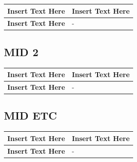 \documentclass [10pt]{article}
\begin{document}
\begin{longtable}{| p{ } | p{ } | }\hline 
\textbf{Insert Text Here} & \textbf{Insert Text Here} \\ \hline
\textbf{Insert Text Here} & -\\ \hline 
\end{longtable}


\subsection {MID 2 }

\begin{longtable}{| p{ } | p{ } | }\hline 
\textbf{Insert Text Here} & \textbf{Insert Text Here} \\ \hline
\textbf{Insert Text Here} & -\\ \hline 
\end{longtable}


\subsection {MID ETC}

\begin{longtable}{| p{ } | p{ } | }\hline 
\textbf{Insert Text Here} & \textbf{Insert Text Here} \\ \hline
\textbf{Insert Text Here} & -\\ \hline 
\end{longtable}

\end{document}

